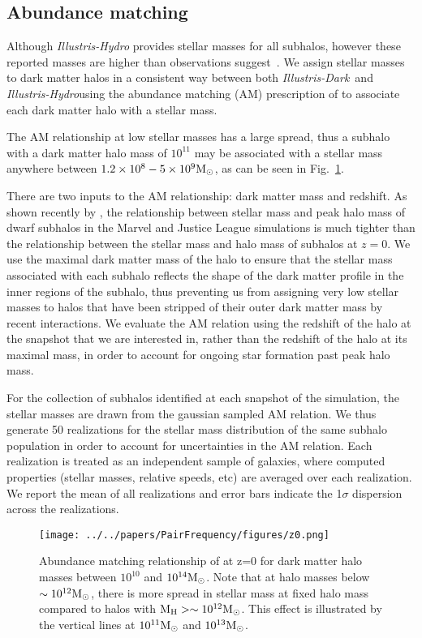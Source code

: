 \documentclass[twocolumn]{aastex63}
\newcommand\msun{\rm{M}_{\odot}}
\newcommand\ID{\textit{Illustris-Dark}}
\newcommand\IH{\textit{Illustris-Hydro}}
\newcommand{\gb}[1]{\textcolor{olive}{\textbf{#1}} }
\begin{document}
\subsection{Abundance matching}\label{sec:abundanceMatching}
Although \textit{Illustris-Hydro} provides stellar masses for all subhalos, however these reported masses are higher than observations suggest~\citep{genel14}. We assign stellar masses to dark matter halos in a consistent way between both \ID\ and \IH using the abundance matching (AM) prescription of \citet{moster13} to associate each dark matter halo with a stellar mass. 

The AM relationship at low stellar masses has a large spread, thus a subhalo with a dark matter halo mass of $10^{11}$ may be associated with a stellar mass anywhere between $1.2\times10^{8} - 5\times10^{9}\rm M_\odot$, as can be seen in Fig.~\ref{fig:abundanceMatching}.

There are two inputs to the AM relationship: dark matter mass and redshift. As shown recently by \citet{munshi21}, the relationship between stellar mass and peak halo mass of dwarf subhalos in the Marvel and Justice League simulations is much tighter than the relationship between the stellar mass and halo mass of subhalos at $z=0$. We use the maximal dark matter mass of the halo to ensure that the stellar mass associated with each subhalo reflects the shape of the dark matter profile in the inner regions of the subhalo, thus preventing us from assigning very low stellar masses to halos that have been stripped of %
their outer dark matter mass by recent interactions. We evaluate the AM relation using the redshift of the halo at the snapshot that we are interested in, rather than the redshift of the halo at its maximal mass, in order to account for ongoing star formation past peak halo mass. 

For the collection of subhalos identified at each snapshot of the simulation, the stellar masses are drawn from the gaussian sampled AM relation. We thus generate 50 realizations for the stellar mass distribution of the same subhalo population in order to account for uncertainties in the AM relation. Each realization is treated as an independent sample of galaxies, where computed properties (stellar masses, relative speeds, etc) are averaged over each realization. We report the mean of all realizations and error bars indicate the 1$\sigma$ dispersion across the realizations.

\begin{figure}[htb]
  \centering
  \texttt{[image: ../../papers/PairFrequency/figures/z0.png]}
  \caption{\label{fig:abundanceMatching} Abundance matching relationship of \citet{moster13} at z=0 for dark matter halo masses between $10^{10}$ and $10^{14} \msun$. Note that at halo masses below $\sim10^{12} \msun$, there is more spread in stellar mass at fixed halo mass compared to halos with $\rm M_{H} > \sim10^{12} \msun$. This effect is illustrated by the vertical lines at $10^{11}\msun$ and $10^{13}\msun$. %
  }
\end{figure}
\end{document}
